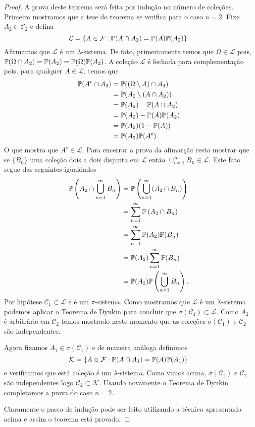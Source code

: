 \begin{proof}
A prova deste teorema será feita por indução 
no número de coleções. 
Primeiro mostramos que a tese do teorema se 
verifica para o caso $n=2$. 
Fixe $A_2\in\mathcal{C}_2$ e defina
	\[
		\mathcal{L}
		=
		\{ A\in \F: \P(A\cap A_2) = \P(A)\P(A_2)\}.
	\]
Afirmamos que $\mathcal{L}$ é um $\lambda$-sistema.
De fato, primeiramente temos que $\Omega\in \mathcal{L}$ pois, 
$\P(\Omega\cap A_2)=\P(A_2)=\P(\Omega)\P(A_2)$.
A coleção $\mathcal{L}$ é fechada para complementação pois, 
para qualquer $A\in\mathcal{L}$, temos que
	\begin{align*}
	\P(A^c\cap A_2) 
	&=
	\P((\Omega\setminus A)\cap A_2)
	\\
	&=
	\P( A_2\setminus (A\cap A_2))
	\\
	&=
	\P( A_2) -\P(A\cap A_2)
	\\
	&=
	\P( A_2) -\P(A)\P(A_2)
	\\
	&=
	\P( A_2) (1-\P(A))
	\\
	&=
	\P(A_2)\P(A^c).
	\end{align*}
O que mostra que $A^c\in\mathcal{L}$. 
Para encerrar a prova da afimarção resta
mostrar que se $\{B_n\}$ uma coleção dois a dois disjunta 
em $\mathcal{L}$ então $\cup_{i=1}^{\infty} B_n\in\mathcal{L}$.
Este fato segue das seguintes igualdades
	\begin{align*}
	\P \left( A_2 \cap \bigcup_{n=1}^{\infty} B_n \right) 
	&=
	\P \left( \bigcup_{n=1}^{\infty} (A_2 \cap B_n) \right) 
	\\
	&=
	\sum_{n=1}^{\infty}\P \left( A_2 \cap B_n \right) 
	\\
	&=
	\sum_{n=1}^{\infty}\P(A_2)\P(B_n)
	\\
	&=
	\P(A_2)\sum_{n=1}^{\infty}\P(B_n)
	\\
	&=
	\P(A_2) \P \left( \bigcup_{n=1}^{\infty} B_n \right). 
	\end{align*}
%
%
%
Por hipótese $\mathcal{C}_1\subset \mathcal{L}$ 
e é um $\pi$-sistema.
Como mostramos que $\mathcal{L}$ é um 
$\lambda$-sistema podemos 
aplicar o Teorema de Dynkin para concluir que 
$\sigma(\mathcal{C}_1)\subset \mathcal{L}$.
Como $A_2$ é arbitrário em $\mathcal{C}_2$ 
temos mostrado neste momento que as coleções 
$\sigma(\mathcal{C}_1)$ e $\mathcal{C}_2$ 
são independentes.

Agora fixamos $A_1\in \sigma(\mathcal{C}_1)$ e
de maneira análoga definimos 
	\[
	\mathcal{K}=
	\{ A\in \F: \P(A\cap A_1) = \P(A)\P(A_1)\}
	\]
e verificamos que está coleção é um $\lambda$-sistema.
Como vimos acima, $\sigma(\mathcal{C}_1)$ e $\mathcal{C}_2$ 
são independentes logo $\mathcal{C}_2 \subset \mathcal{K}$.
Usando novamente o Teorema de Dynkin completamos a prova
do caso $n=2$. 

Claramente o passo de indução pode 
ser feito utilizando a técnica apresentada acima e 
assim o teorema está provado.
\end{proof}






